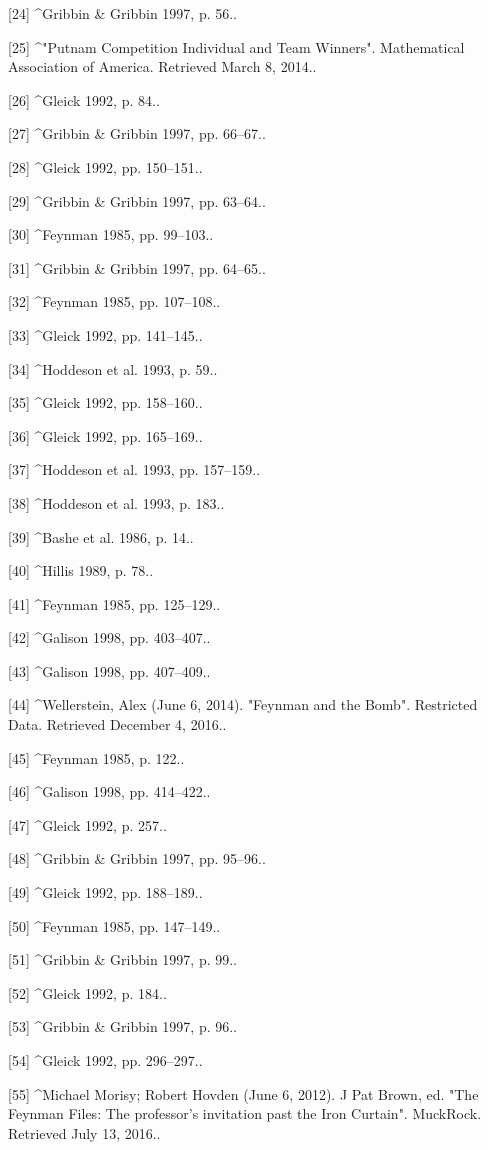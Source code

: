 [24]
^Gribbin & Gribbin 1997, p. 56..

[25]
^"Putnam Competition Individual and Team Winners". Mathematical Association of America. Retrieved March 8, 2014..

[26]
^Gleick 1992, p. 84..

[27]
^Gribbin & Gribbin 1997, pp. 66–67..

[28]
^Gleick 1992, pp. 150–151..

[29]
^Gribbin & Gribbin 1997, pp. 63–64..

[30]
^Feynman 1985, pp. 99–103..

[31]
^Gribbin & Gribbin 1997, pp. 64–65..

[32]
^Feynman 1985, pp. 107–108..

[33]
^Gleick 1992, pp. 141–145..

[34]
^Hoddeson et al. 1993, p. 59..

[35]
^Gleick 1992, pp. 158–160..

[36]
^Gleick 1992, pp. 165–169..

[37]
^Hoddeson et al. 1993, pp. 157–159..

[38]
^Hoddeson et al. 1993, p. 183..

[39]
^Bashe et al. 1986, p. 14..

[40]
^Hillis 1989, p. 78..

[41]
^Feynman 1985, pp. 125–129..

[42]
^Galison 1998, pp. 403–407..

[43]
^Galison 1998, pp. 407–409..

[44]
^Wellerstein, Alex (June 6, 2014). "Feynman and the Bomb". Restricted Data. Retrieved December 4, 2016..

[45]
^Feynman 1985, p. 122..

[46]
^Galison 1998, pp. 414–422..

[47]
^Gleick 1992, p. 257..

[48]
^Gribbin & Gribbin 1997, pp. 95–96..

[49]
^Gleick 1992, pp. 188–189..

[50]
^Feynman 1985, pp. 147–149..

[51]
^Gribbin & Gribbin 1997, p. 99..

[52]
^Gleick 1992, p. 184..

[53]
^Gribbin & Gribbin 1997, p. 96..

[54]
^Gleick 1992, pp. 296–297..

[55]
^Michael Morisy; Robert Hovden (June 6, 2012). J Pat Brown, ed. "The Feynman Files: The professor's invitation past the Iron Curtain". MuckRock. Retrieved July 13, 2016..

